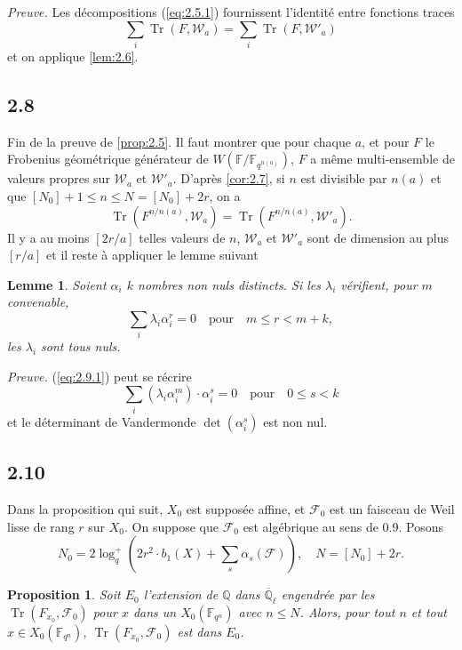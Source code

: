 \documentclass[11pt,a4paper]{article}
\theoremstyle{plain}
\newtheorem{lemma}[theorem]{Lemme}
\newtheorem{proposition}[theorem]{Proposition}
\theoremstyle{definition}
\DeclareMathOperator{\tr}{Tr}
\begin{document}
\noindent\textit{Preuve.} Les d\'ecompositions (\ref{eq:2.5.1}) fournissent l'identit\'e entre fonctions traces
\[
\sum_i \tr(F, \mathcal{W}_a) = \sum_i \tr(F, \mathcal{W}'_a)
\]
et on applique \ref{lem:2.6}.

\subsection{2.8}

Fin de la preuve de \ref{prop:2.5}. Il faut montrer que pour chaque $a$, et pour $F$ le Frobenius g\'eom\'etrique g\'en\'erateur de $W(\mathbb{F}/\mathbb{F}_{q^{n(a)}})$, $F$ a m\^eme multi-ensemble de valeurs propres sur $\mathcal{W}_a$ et $\mathcal{W}'_a$. D'apr\`es \ref{cor:2.7}, si $n$ est divisible par $n(a)$ et que $[N_0]+1 \leq n \leq N = [N_0]+2r$, on a
\[
\tr(F^{n/n(a)}, \mathcal{W}_a) = \tr(F^{n/n(a)}, \mathcal{W}'_a).
\]
Il y a au moins $[2r/a]$ telles valeurs de $n$, $\mathcal{W}_a$ et $\mathcal{W}'_a$ sont de dimension au plus $[r/a]$ et il reste \`a appliquer le lemme suivant

\begin{lemma}\label{lem:2.9}
Soient $\alpha_i$ $k$ nombres non nuls distincts. Si les $\lambda_i$ v\'erifient, pour $m$ convenable,
\begin{equation}\label{eq:2.9.1}
\sum_i \lambda_i \alpha_i^r = 0 \quad \text{pour} \quad m \leq r < m+k,
\end{equation}
les $\lambda_i$ sont tous nuls.
\end{lemma}

\noindent\textit{Preuve.} (\ref{eq:2.9.1}) peut se r\'ecrire
\[
\sum_i (\lambda_i \alpha_i^m) \cdot \alpha_i^s = 0 \quad \text{pour} \quad 0 \leq s < k
\]
et le d\'eterminant de Vandermonde $\det(\alpha_i^s)$ est non nul.

\subsection{2.10}

Dans la proposition qui suit, $X_0$ est suppos\'ee affine, et $\mathcal{F}_0$ est un faisceau de Weil lisse de rang $r$ sur $X_0$. On suppose que $\mathcal{F}_0$ est alg\'ebrique au sens de 0.9. Posons
\[
N_0 = 2\log_q^+\left(2r^2 \cdot b_1(X) + \sum_s \alpha_s(\mathcal{F})\right), \quad N = [N_0] + 2r.
\]
\begin{proposition}\label{prop:2.10}
Soit $E_0$ l'extension de $\mathbb{Q}$ dans $\overline{\mathbb{Q}}_\ell$ engendr\'ee par les $\tr(F_{x_0}, \mathcal{F}_0)$ pour $x$ dans un $X_0(\mathbb{F}_{q^n})$ avec $n \leq N$. Alors, pour tout $n$ et tout $x \in X_0(\mathbb{F}_{q^n})$, $\tr(F_{x_0}, \mathcal{F}_0)$ est dans $E_0$.
\end{proposition}
\end{document}

